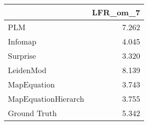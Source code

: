 \begin{tabular}{lr}
\toprule
{} & LFR_om_7 \\
\midrule
PLM                 &    7.262 \\
Infomap             &    4.045 \\
Surprise            &    3.320 \\
LeidenMod           &    8.139 \\
MapEquation         &    3.743 \\
MapEquationHierarch &    3.755 \\
Ground Truth        &    5.342 \\
\bottomrule
\end{tabular}

